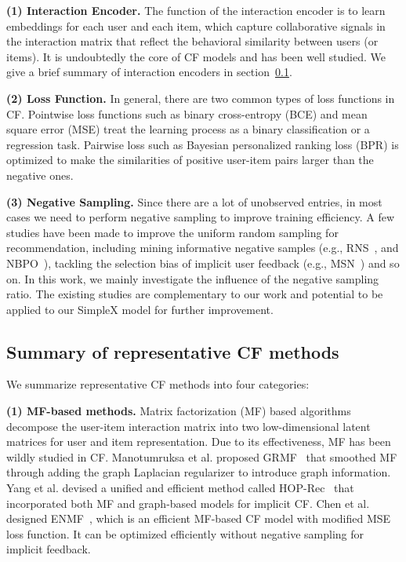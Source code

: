\documentclass[sigconf,authorversion]{acmart}
\begin{document}
\textbf{(1) Interaction Encoder.} 
The function of the interaction encoder is to learn embeddings for each user and each item, which capture collaborative signals in the interaction matrix that reflect the behavioral similarity between users (or items). 
    It is undoubtedly the core of CF models and has been well studied. We give a brief summary of interaction encoders in section~\ref{sec::sotacf}.
    
\textbf{(2) Loss Function.} 
In general, there are two common types of loss functions in CF.
    Pointwise loss functions such as binary cross-entropy (BCE) and mean square error (MSE) treat the learning process as a binary classification or a regression task.
    Pairwise loss such as Bayesian personalized ranking loss (BPR) is optimized to make the similarities of positive user-item pairs larger than the negative ones.
    
\textbf{(3) Negative Sampling.} 
    Since there are a lot of unobserved entries, in most cases we need to perform negative sampling to improve training efficiency. A few studies have been made to improve the uniform random sampling for recommendation, including mining informative negative samples (e.g., RNS~\cite{reinforced_sampling}, and NBPO~\cite{NBPO}), tackling the selection bias of implicit user feedback (e.g., MSN~\cite{mixed_sampling}) and so on. 
    In this work, we mainly investigate the influence of the negative sampling ratio.
    The existing studies are complementary to our work and potential to be applied to our SimpleX model for further improvement.



\subsection{Summary of representative CF methods}
\label{sec::sotacf}
We summarize representative CF methods into four categories:

\textbf{(1) MF-based methods.} 
Matrix factorization (MF) based algorithms decompose the user-item interaction matrix into two low-dimensional latent matrices for user and item representation. 
Due to its effectiveness, MF has been wildly studied in CF. 
Manotumruksa et al. proposed GRMF~\cite{GRMF} that smoothed MF through adding the graph Laplacian regularizer to introduce graph information. 
Yang et al. devised a unified and efficient method called HOP-Rec~\cite{HOP-Rec} that incorporated both MF and graph-based models for implicit CF.
Chen et al. designed ENMF~\cite{ENMF}, which is an efficient MF-based CF model with modified MSE loss function. It can be optimized efficiently without negative sampling for implicit feedback.
\end{document}
